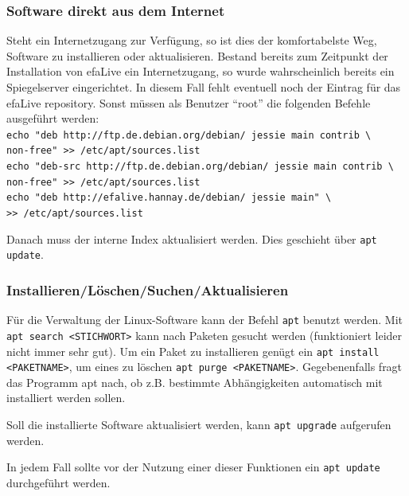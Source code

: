 \documentclass[a4paper,12pt,twoside]{article}
\begin{document}
\subsubsection{Software direkt aus dem Internet}
\label{sct:software_internet}
Steht ein Internetzugang zur Verfügung, so ist dies der komfortabelste
Weg, Software zu installieren oder aktualisieren. Bestand bereits zum
Zeitpunkt der Installation von efaLive ein Internetzugang, so wurde
wahrscheinlich bereits ein Spiegelserver eingerichtet. In diesem Fall fehlt
eventuell noch der Eintrag für das efaLive repository. Sonst müssen als
Benutzer "`root"' die folgenden Befehle ausgeführt werden:
\bigskip
\\
\texttt{echo "deb http://ftp.de.debian.org/debian/ jessie main contrib \textbackslash\\
    non-free"\ {\textgreater}{\textgreater} /etc/apt/sources.list}
\\
\texttt{echo "deb-src http://ftp.de.debian.org/debian/ jessie main contrib \textbackslash\\
    non-free"\ {\textgreater}{\textgreater} /etc/apt/sources.list}
\\
\texttt{echo "deb http://efalive.hannay.de/debian/ jessie main" \textbackslash\\
    {\textgreater}{\textgreater} /etc/apt/sources.list}

\bigskip
Danach muss der interne Index aktualisiert werden. Dies geschieht über
\texttt{apt update}.


\subsubsection{Installieren/Löschen/Suchen/Aktualisieren}
\label{sct:software_install}
Für die Verwaltung der
Linux-Software kann der Befehl \texttt{apt}
benutzt werden. Mit \texttt{apt search
{\textless}STICHWORT{\textgreater}} kann nach Paketen
gesucht werden (funktioniert leider nicht immer sehr gut). Um ein Paket
zu installieren genügt ein \texttt{apt install
{\textless}PAKETNAME{\textgreater}}, um eines zu löschen
\texttt{apt purge
{\textless}PAKETNAME{\textgreater}}. Gegebenenfalls fragt
das Programm apt nach, ob z.B. bestimmte Abhängigkeiten
automatisch mit installiert werden sollen.

Soll die installierte Software aktualisiert werden, kann
\texttt{apt upgrade} aufgerufen werden.

In jedem Fall sollte vor der Nutzung einer dieser Funktionen ein
\texttt{apt update} durchgeführt werden.
\end{document}
